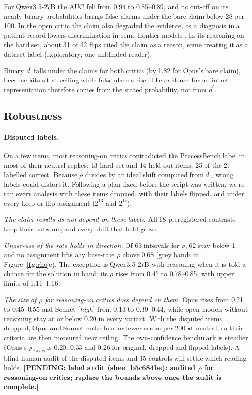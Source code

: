 \documentclass[letterpaper]{article} %
\newcommand{\pending}[1]{\textbf{[PENDING: #1]}}
\newcommand{\dprime}{d^{\prime}}
\begin{document}
For Qwen3.5-27B the AUC fell from 0.94 to 0.85--0.89, and no cut-off on its nearly binary probabilities brings false alarms under the bare claim below 28 per 100. In the open critic the claim also degraded the evidence, as a diagnosis in a patient record lowers discrimination in some frontier models \citep{rosenblum2026record}. In its reasoning on the hard set, about 31 of 42 flips cited the claim as a reason, some treating it as a dataset label (exploratory; one unblinded reader).

Binary $\dprime$ falls under the claims for both critics (by 1.82 for Opus's bare claim), because hits sit at ceiling while false alarms rise. The evidence for an intact representation therefore comes from the stated probability, not from $\dprime$.

\subsection{Robustness}
\label{sec:robust}

\paragraph{Disputed labels.} On a few items, most reasoning-on critics contradicted the ProcessBench label in most of their neutral replies: 13 hard-set and 14 held-out items, 25 of the 27 labelled correct. Because $\rho$ divides by an ideal shift computed from $\dprime$, wrong labels could distort it. Following a plan fixed before the script was written, we re-ran every analysis with these items dropped, with their labels flipped, and under every keep-or-flip assignment ($2^{13}$ and $2^{14}$).

\emph{The claim results do not depend on these labels.} All 18 preregistered contrasts keep their outcome, and every shift that held grows.

\emph{Under-use of the rate holds in direction.} Of 63 intervals for $\rho$, 62 stay below 1, and no assignment lifts any base-rate $\rho$ above 0.68 (grey bands in Figure~\ref{fig:rho}c). The exception is Qwen3.5-27B with reasoning when it is told a chance for the solution in hand: its $\rho$ rises from 0.47 to 0.78--0.85, with upper limits of 1.11--1.16.

\emph{The size of $\rho$ for reasoning-on critics does depend on them.} Opus rises from 0.21 to 0.45--0.55 and Sonnet (\emph{high}) from 0.13 to 0.39--0.44, while open models without reasoning stay at or below 0.20 in every variant. With the disputed items dropped, Opus and Sonnet make four or fewer errors per 200 at neutral, so their criteria are then measured near ceiling. The own-confidence benchmark is steadier (Opus's $\rho_{\mathrm{Bayes}}$ is 0.20, 0.33 and 0.26 for original, dropped and flipped labels). A blind human audit of the disputed items and 15 controls will settle which reading holds. \pending{label audit (sheet b5c684be): audited $\rho$ for reasoning-on critics; replace the bounds above once the audit is complete.}
\end{document}
